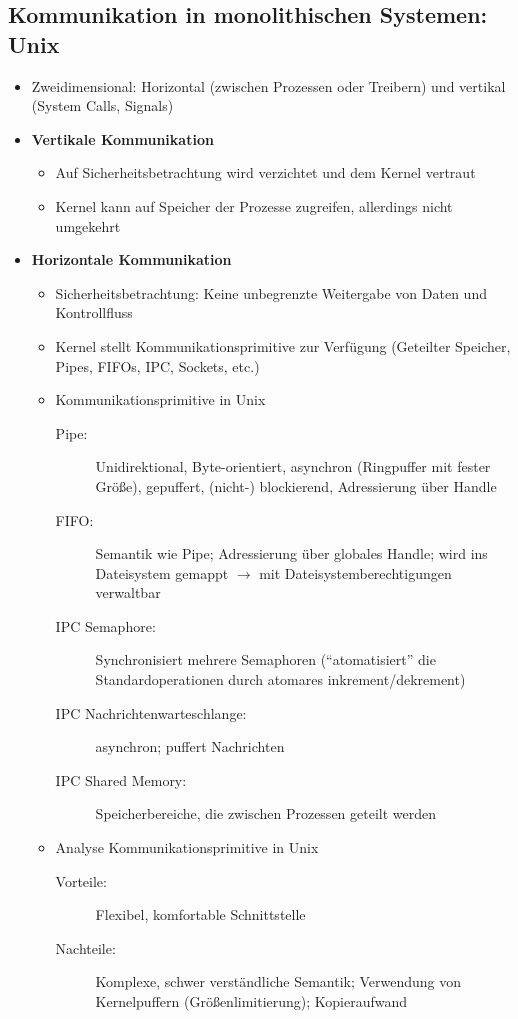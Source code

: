 \subsection{Kommunikation in monolithischen Systemen: Unix}
\begin{itemize}
	\item Zweidimensional: Horizontal (zwischen Prozessen oder Treibern) und vertikal (System Calls, Signals)
	\item \textbf{Vertikale Kommunikation}
	\begin{itemize}
		\item Auf Sicherheitsbetrachtung wird verzichtet und dem Kernel vertraut
		\item Kernel kann auf Speicher der Prozesse zugreifen, allerdings nicht umgekehrt
	\end{itemize}
	\item \textbf{Horizontale Kommunikation}
	\begin{itemize}
		\item Sicherheitsbetrachtung: Keine unbegrenzte Weitergabe von Daten und Kontrollfluss
		\item Kernel stellt Kommunikationsprimitive zur Verfügung (Geteilter Speicher, Pipes, FIFOs, IPC, Sockets, etc.)
		\item Kommunikationsprimitive in Unix
		\begin{description}
			\item[Pipe:] Unidirektional, Byte-orientiert, asynchron (Ringpuffer mit fester Größe), gepuffert, (nicht-) blockierend, Adressierung über Handle
			\item[FIFO:] Semantik wie Pipe; Adressierung über globales Handle; wird ins Dateisystem gemappt \(\rightarrow\) mit Dateisystemberechtigungen verwaltbar
			\item[IPC Semaphore:] Synchronisiert mehrere Semaphoren ("`atomatisiert"' die Standardoperationen durch atomares inkrement/dekrement)
			\item[IPC Nachrichtenwarteschlange:] asynchron; puffert Nachrichten
			\item[IPC Shared Memory:] Speicherbereiche, die zwischen Prozessen geteilt werden
		\end{description}
		\item Analyse Kommunikationsprimitive in Unix
		\begin{description}
			\item[Vorteile:] Flexibel, komfortable Schnittstelle
			\item[Nachteile:] Komplexe, schwer verständliche Semantik; Verwendung von Kernelpuffern (Größenlimitierung); Kopieraufwand
		\end{description}
	\end{itemize}
\end{itemize}


